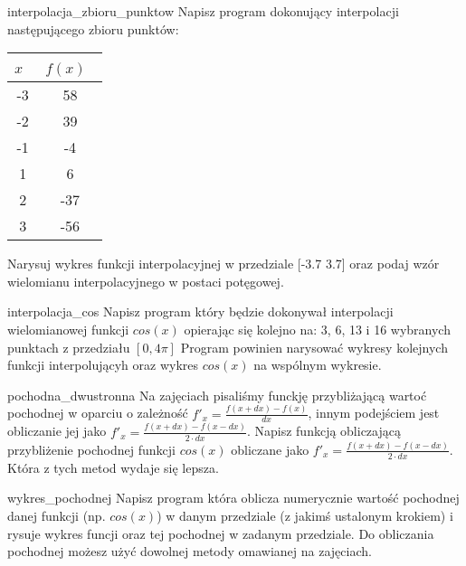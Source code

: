 \documentclass{pdfBooklets}
\begin{document}
\begin{Zadanie}{}{interpolacja_zbioru_punktow}
Napisz program dokonujący interpolacji następującego zbioru punktów:
\begin{center}\begin{tabular}{|c|c|}
\hline\hspace{.75cm}$x$\hspace{.75cm}~&\hspace{.75cm}$f(x)$\hspace{.75cm}~\\\hline 
-3 & 58 \\
-2 & 39 \\
-1 & -4 \\
1  & 6 \\
2  & -37 \\
3  & -56 \\
\hline
\end{tabular}\end{center}
Narysuj wykres funkcji interpolacyjnej w przedziale [-3.7 3.7] oraz podaj wzór wielomianu interpolacyjnego w postaci potęgowej.
\end{Zadanie}

\begin{Zadanie}{}{interpolacja_cos}
Napisz program który będzie dokonywał interpolacji wielomianowej funkcji $cos(x)$ opierając się kolejno na: 3, 6, 13 i 16 wybranych punktach z przedziału $[0, 4\pi]$
Program powinien narysować wykresy kolejnych funkcji interpolującyh oraz wykres $cos(x)$ na wspólnym wykresie.
\end{Zadanie}


\begin{Zadanie}{}{pochodna_dwustronna}
Na zajęciach pisaliśmy funckję przybliżającą wartoć pochodnej w oparciu o zależność $f'_x=  \frac{f(x+dx) - f(x)}{dx}$, innym podejściem jest obliczanie jej jako $f'_x=  \frac{f(x+dx) - f(x-dx)}{2 \cdot dx}$.
Napisz funkcją obliczającą przybliżenie pochodnej funkcji $cos(x)$ obliczane jako $f'_x=  \frac{f(x+dx) - f(x-dx)}{2 \cdot dx}$. Która z tych metod wydaje się lepsza.
\end{Zadanie}

\begin{Zadanie}{}{wykres_pochodnej}
Napisz program która oblicza numerycznie wartość pochodnej danej funkcji (np. $cos(x)$) w danym przedziale (z jakimś ustalonym krokiem) i rysuje wykres funcji oraz tej pochodnej w zadanym przedziale.
Do obliczania pochodnej możesz użyć dowolnej metody omawianej na zajęciach.
\end{Zadanie}
\end{document}
